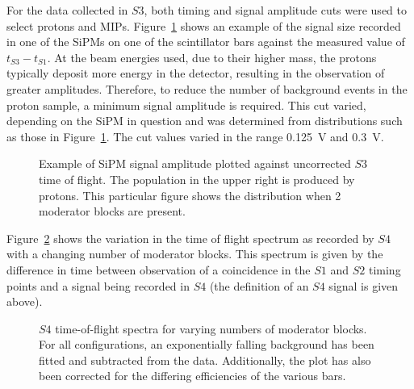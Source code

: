 For the data collected in $\mathit{S3}$, both timing and signal amplitude cuts were used to select protons and MIPs.
Figure~\ref{fig:TvsA} shows an example of the signal size recorded in one of the SiPMs on one of the scintillator bars against the measured value of $t_{\mathit{S3}} - t_{\mathit{S1}}$.
At the beam energies used, due to their higher mass, the protons typically deposit more energy in the detector, resulting in the observation of greater amplitudes.
Therefore, to reduce the number of background events in the proton sample, a minimum signal amplitude is required.
This cut varied, depending on the SiPM in question and was determined from distributions such as those in Figure~\ref{fig:TvsA}. 
The cut values varied in the range 0.125~V and 0.3~V.

\begin{figure}[h]
  \begin{adjustbox}{max totalsize={.7\textwidth}, center}
    
  \end{adjustbox}
  \caption{Example of SiPM signal amplitude plotted against uncorrected $\mathit{S3}$ time of flight. The population in the upper right is produced by protons. This particular figure shows the distribution when 2 moderator blocks are present.}
  \label{fig:TvsA}
\end{figure}

Figure~\ref{fig:s4tof} shows the variation in the time of flight spectrum as recorded by $\mathit{S4}$ with a changing number of moderator blocks.
This spectrum is given by the difference in time between observation of a coincidence in the $\mathit{S1}$ and $\mathit{S2}$ timing points and a signal being recorded in $\mathit{S4}$ (the definition of an $\mathit{S4}$ signal is given above).

\begin{figure}[h]
  \begin{adjustbox}{max totalsize={.8\textwidth}{.5\textheight},center}
    
  \end{adjustbox}
  \caption{$\mathit{S4}$ time-of-flight spectra for varying numbers of moderator blocks. For all configurations, an exponentially falling background has been fitted and subtracted from the data. Additionally, the plot has also been corrected for the differing efficiencies of the various bars.}
  \label{fig:s4tof}	
\end{figure}

